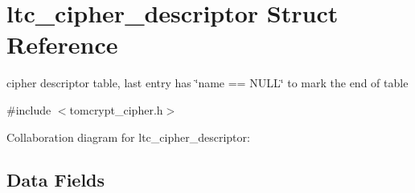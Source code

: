 \hypertarget{structltc__cipher__descriptor}{}\section{ltc\+\_\+cipher\+\_\+descriptor Struct Reference}
\label{structltc__cipher__descriptor}


cipher descriptor table, last entry has \char`\"{}name == N\+U\+L\+L\char`\"{} to mark the end of table  




{\ttfamily \#include $<$tomcrypt\+\_\+cipher.\+h$>$}



Collaboration diagram for ltc\+\_\+cipher\+\_\+descriptor\+:
\subsection*{Data Fields}
